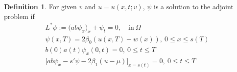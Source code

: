 \documentclass[letterpaper, 10pt]{amsart}
\theoremstyle{definition}
\newtheorem{definition}{Definition}
\theoremstyle{remark}
\begin{document}
\begin{definition}\label{defn:adjoint}
  For given $v$ and $u = u(x, t; v)$, $\psi$ is a solution to the adjoint problem if
  \begin{gather}
    L^{*} \psi := \big(a b \psi_x\big)_x + \psi_t = 0,\quad\text{in}~\Omega \label{eq:adj-pde}
    \\
    \psi(x, T) = 2\beta_0(u(x, T) - w(x)),~0 \leq x \leq s(T) \label{eq:adj-finalmoment}
    \\
    b(0)a(t)\psi_x(0, t) =0,~0 \leq t \leq T \label{eq:adj-robin-fixed}
    \\
    \Big[a b \psi_x - s'\psi - 2\beta_1(u - \mu)\Big]_{x=s(t)}=0, ~0 \leq t \leq T \label{eq:adj-robin-free}
  \end{gather}
\end{definition}
\end{document}
